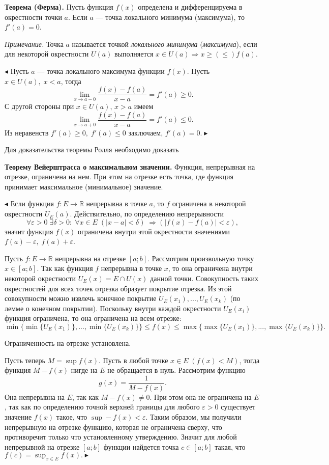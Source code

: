 \documentclass[12pt]{article}
\begin{document}
\textbf{Теорема (Ферма).} Пусть функция $f(x)$ определена и дифференцируема в окрестности точки $a$. Если $a$ --- точка локального минимума (максимума), то $f'(a) = 0$.

\textit{Примечание.} Точка $a$ называется точкой \textit{локального минимума} (\textit{максимума}), если для некоторой окрестности $U(a)$ выполняется $x \in U(a) \Rightarrow x \geq (\leq) f(a)$.

$\blacktriangleleft$ Пусть $a$ --- точка локального максимума функции $f(x)$. Пусть $x \in U(a), \; x < a$, тогда
$$
	\lim_{x \rightarrow a - 0 } \frac{f(x) - f(a)}{x - a} = f'(a) \geq 0.
$$
С другой стороны при $x \in U(a)$, $x > a$ имеем
$$
\lim_{x \rightarrow a + 0 } \frac{f(x) - f(a)}{x - a} = f'(a) \leq 0.
$$
Из неравенств $f'(a) \geq 0, \; f'(a) \leq 0$ заключаем, $f'(a) = 0. \blacktriangleright$

Для доказательства теоремы Ролля необходимо доказать 

\textbf{Теорему Вейерштрасса о максимальном значении.} Функция, непрерывная на отрезке, ограничена на нем. При этом на отрезке есть точка, где функция принимает максимальное (минимальное) значение.


$\blacktriangleleft$ Если функция $f: E \rightarrow \mathbb{R}$ непрерывна в точке $a$, то $f$ ограничена в некоторой окрестности $U_E(a)$. Действительно, по определению непрерывности
$$
\forall \varepsilon > 0 \; \exists \delta > 0: \; \forall x \in E \; (|x - a| < \delta) \; \Rightarrow (|f(x) - f(a)| < \varepsilon),
$$ 
значит функция $f(x)$ ограничена внутри этой окрестности значениями $f(a) - \varepsilon, \; f(a) + \varepsilon$. 

Пусть $f: E \rightarrow \mathbb{R}$ непрерывна на отрезке $[a;b]$. Рассмотрим произвольную точку $x \in [a;b]$. Так как функция $f$ непрерывна в точке $x$, то она ограничена внутри некоторой окрестности $U_E(x) = E \cap U(x)$ данной точки. Совокупность таких окрестностей для всех точек отрезка образует покрытие отрезка. Из этой совокупности можно извлечь конечное покрытие $U_E(x_1), ..., U_E(x_k)$ (по лемме о конечном покрытии). Поскольку внутри каждой окрестности $U_E(x_i)$ функция ограничена, то она ограничена на всем отрезке:
$$
\min \{ \min\{U_E(x_1)\}, ..., \min\{U_E(x_k)\}\} \leq f(x)\leq \max \{ \max\{ U_E(x_1)\}, ..., \max\{ U_E(x_k)\} \}.
$$

Ограниченность на отрезке установлена.

Пусть теперь $M = \sup f(x)$. Пусть в любой точке $x \in E \; (f(x) < M)$,  тогда функция $M - f(x)$ нигде на $E$ не обращается в нуль. Рассмотрим функцию 
$$
g(x) = \frac{1}{M - f(x)}.
$$
Она непрерывна на $E$, так как $M - f(x) \neq 0$. При этом она не ограничена на $E$, так как по определению точной верхней границы для любого $\varepsilon > 0$ существует значение $f(x)$ такое, что $\sup - f(x) < \varepsilon$. Таким образом, мы получили непрерывную на отрезке функцию, которая не ограничена сверху, что противоречит только что установленному утверждению. Значит для любой непрерывной на отрезке $[a;b]$ функции найдется точка $c \in [a;b]$ такая, что $f(c) = \sup_{x \in E} f(x). \blacktriangleright$
\end{document}
